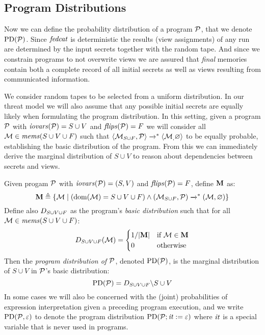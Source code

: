 \subsection{Program Distributions}
Now we can define the probability distribution of a program $\mathcal{P}$,
that we denote $\mathrm{PD}(\mathcal{P})$. Since $\mathit{fedcat}$ is deterministic the
results (view assignments) of any run are determined by the input
secrets together with the random tape. And since we constrain programs
to not overwrite views we are assured that \emph{final} memories
contain both a complete record of all initial secrets as well as views
resulting from communicated information.

We consider random tapes to be selected from a uniform distribution.
In our threat model we will also assume that any possible initial
secrets are equally likely when formulating the program distribution.
In this setting, given a program $\mathcal{P}$ with $\mathit{iovars}(\mathcal{P}) = S \cup
V$ and $\mathit{flips}(\mathcal{P}) = F$ we will consider all $\mathcal{M}
\in \mathit{mems}(S \cup V \cup F)$ such that
$
\langle \mathcal{M}_{S \cup F},\mathcal{P} \rangle \xrightarrow{}^{*} \langle \mathcal{M}_,\varnothing \rangle
$
to be equally probable, establishing the basic distribution of the
program. From this we can immediately derive the marginal distribution
of $S \cup V$ to reason about dependencies between secrets and views. 
\begin{definition}
  \label{def-progd}
  Given progam $\mathcal{P}$ with $\mathit{iovars}(\mathcal{P}) = (S,V)$ and $\mathit{flips}(\mathcal{P}) = F$, define $\mathbf{M}$ as:
  $$
  \mathbf{M} \triangleq \{ \mathcal{M} \mid (\mathrm{dom}(\mathcal{M}) = S \cup V \cup F) \wedge (\mathcal{M}_{S \cup F},\mathcal{P}) \xrightarrow{}^{*} (\mathcal{M},\varnothing) \}
  $$
  Define also $D_{S \cup V \cup F}$ as the program's \emph{basic distribution} such that for all
  $\mathcal{M} \in \mathit{mems}(S \cup V \cup F)$:
  $$
  D_{S \cup V \cup F}(\mathcal{M}) =
  \begin{cases}
    1 / |\mathbf{M}| & \text{if}\ \mathcal{M} \in \mathbf{M}\\
    0 & \text{otherwise}
  \end{cases}
  $$
  Then the \emph{program distribution of $\mathcal{P}$}, denoted $\mathrm{PD}(\mathcal{P})$, is the
  marginal distribution of $S \cup V$ in $\mathcal{P}$'s basic distribution:
  $$
  \mathrm{PD}(\mathcal{P}) =  D_{S \cup V \cup F}\backslash S\cup V
  $$
  In some cases we will also be concerned with the (joint)
  probabilities of expression interpretation given a preceding program
  execution, and we write $\mathrm{PD}(\mathcal{P}, \varepsilon)$ to denote the program
  distribution $\mathrm{PD}(\mathcal{P};\mathit{it} := \varepsilon)$ where $\mathit{it}$ is a
  special variable that is never used in programs.
\end{definition}
